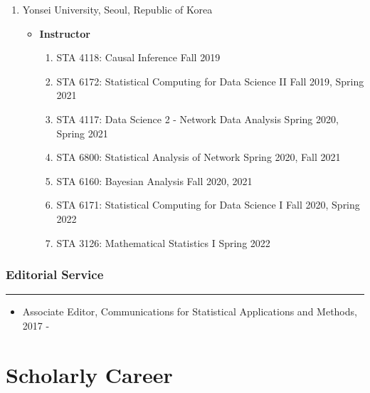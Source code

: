 \documentclass[
]{book}
\providecommand{\tightlist}{%
  \setlength{\itemsep}{0pt}\setlength{\parskip}{0pt}}
\begin{document}
\begin{enumerate}
\def\labelenumi{\arabic{enumi}.}
\setcounter{enumi}{2}
\item
  Yonsei University, Seoul, Republic of Korea

  \begin{itemize}
  \tightlist
  \item
    \textbf{Instructor}

    \begin{enumerate}
    \def\labelenumii{\arabic{enumii}.}
    \tightlist
    \item
      STA 4118: Causal Inference Fall 2019
    \item
      STA 6172: Statistical Computing for Data Science II Fall 2019, Spring 2021
    \item
      STA 4117: Data Science 2 - Network Data Analysis Spring 2020, Spring 2021
    \item
      STA 6800: Statistical Analysis of Network Spring 2020, Fall 2021
    \item
      STA 6160: Bayesian Analysis Fall 2020, 2021
    \item
      STA 6171: Statistical Computing for Data Science I Fall 2020, Spring 2022
    \item
      STA 3126: Mathematical Statistics I Spring 2022
    \end{enumerate}
  \end{itemize}
\end{enumerate}

\hypertarget{editorial-service}{%
\subsubsection*{Editorial Service}\label{editorial-service}}

\begin{center}\rule{0.5\linewidth}{0.5pt}\end{center}

\begin{itemize}
\tightlist
\item
  Associate Editor, Communications for Statistical Applications and Methods, 2017 -
\end{itemize}

\hypertarget{scholarly-career}{%
\section*{Scholarly Career}\label{scholarly-career}}
\end{document}
